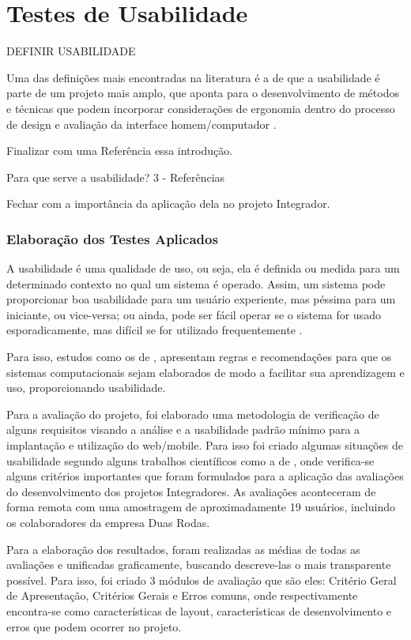 \chapter{Testes de Usabilidade}

DEFINIR USABILIDADE

Uma das definições mais encontradas na literatura é a de que a usabilidade é parte de um projeto mais amplo, que aponta para o desenvolvimento de métodos e técnicas que podem incorporar considerações de ergonomia dentro do processo de design e avaliação da interface homem/computador \cite{bastien1993ergonomic}.

Finalizar com uma Referência essa introdução. 

Para que serve a usabilidade?  3 -  Referências

Fechar com a  importância da aplicação dela no projeto Integrador.


\subsection{Elaboração dos Testes Aplicados}

A usabilidade é uma qualidade de uso, ou seja, ela é definida ou medida para um determinado contexto no qual um sistema é operado. Assim, um sistema pode proporcionar boa usabilidade para um usuário experiente, mas péssima para um iniciante, ou vice-versa; ou ainda, pode ser fácil operar se o sistema for usado esporadicamente, mas difícil se for utilizado frequentemente \cite{cybis2003engenharia}.

Para isso, estudos como os de \cite{bastien1993ergonomic}, apresentam regras e recomendações para que os sistemas computacionais sejam elaborados de modo a facilitar sua aprendizagem e uso, proporcionando usabilidade.

Para a avaliação do projeto, foi elaborado uma metodologia de verificação de alguns requisitos visando a análise e a usabilidade padrão mínimo para a implantação e utilização do web/mobile. Para isso foi criado algumas situações de usabilidade segundo alguns trabalhos científicos como a de \cite{silva2016principios}, onde verifica-se alguns critérios importantes que foram formulados para a aplicação das avaliações do desenvolvimento dos projetos Integradores. As avaliações aconteceram de forma remota com uma amostragem de aproximadamente 19 usuários, incluindo os colaboradores da empresa Duas Rodas.

Para a elaboração dos resultados, foram realizadas as médias de todas as avaliações e unificadas graficamente, buscando descreve-las o mais transparente possível. Para isso, foi criado 3 módulos de avaliação que são eles: Critério Geral de Apresentação, Critérios Gerais e Erros comuns, onde respectivamente encontra-se como características de layout, características de desenvolvimento e erros que podem ocorrer no projeto.

